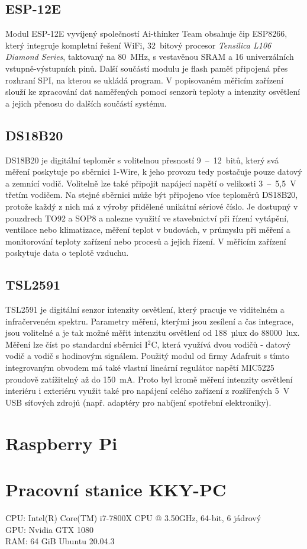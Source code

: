     \subsection{ESP-12E}
        Modul ESP-12E vyvíjený společností Ai-thinker Team obsahuje čip ESP8266, který integruje kompletní řešení WiFi, 32~bitový procesor \emph{Tensilica L106 Diamond Series}, taktovaný na 80~MHz, s vestavěnou SRAM a 16 univerzálních vstupně-výstupních pinů. Další součástí modulu je flash paměť připojená přes rozhraní SPI, na kterou se ukládá program. \cite{ai-thinker:esp12e} V popisovaném měřicím zařízení slouží ke zpracování dat naměřených pomocí senzorů teploty a intenzity osvětlení a jejich přenosu do dalších součástí systému.
    \subsection{DS18B20}
        DS18B20 je digitální teploměr s volitelnou přesností 9~--~12~bitů, který svá měření poskytuje po sběrnici 1-Wire, k jeho provozu tedy postačuje pouze datový a zemnící vodič. Volitelně lze také připojit napájecí napětí o velikosti 3~--~5{,}5~V třetím vodičem. Na stejné sběrnici může být připojeno více teploměrů DS18B20, protože každý z nich má z výroby přidělené unikátní sériové číslo. Je dostupný v pouzdrech TO92 a SOP8 a nalezne využití ve stavebnictví při řízení vytápění, ventilace nebo klimatizace, měření teplot v budovách, v průmyslu při měření a monitorování teploty zařízení nebo procesů a jejich řízení. \cite{dallas:ds18b20} V měřicím zařízení poskytuje data o teplotě vzduchu.
    \subsection{TSL2591}
        TSL2591 je digitální senzor intenzity osvětlení, který pracuje ve viditelném a infračerveném spektru. Parametry měření, kterými jsou zesílení a čas integrace, jsou volitelné a je tak možné měřit intenzitu osvětlení od 188~µlux do $88000$~lux. Měření lze číst po standardní sběrnici I$^2$C, která využívá dvou vodičů - datový vodič a vodič s hodinovým signálem. Použitý modul od firmy Adafruit s tímto integrovaným obvodem má také vlastní lineární regulátor napětí MIC5225 proudově zatížitelný až do 150~mA. \cite{adafruit:tsl2591} Proto byl kromě měření intenzity osvětlení interiéru i exteriéru využit také pro napájení celého zařízení z rozšířených 5~V USB síťových zdrojů (např. adaptéry pro nabíjení spotřební elektroniky).
\section{Raspberry Pi} \label{sec:rpi}
\section{Pracovní stanice KKY-PC}
CPU: Intel(R) Core(TM) i7-7800X CPU @ 3.50GHz, 64-bit, 6 jádrový\\
GPU: Nvidia GTX 1080\\
RAM: 64 GiB
Ubuntu 20.04.3

